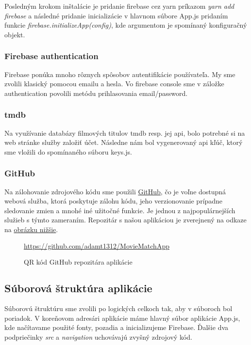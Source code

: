Posledným krokom inštalácie je pridanie firebase cez yarn príkazom \textit{yarn add firebase} a následné pridanie inicializácie v hlavnom súbore App.js pridaním funkcie \textit{firebase.initializeApp(config)}, kde argumentom je spomínaný konfiguračný objekt.
\subsubsection{Firebase authentication}
Firebase ponúka mnoho rôznych spôsobov autentifikácie používateľa. My sme zvolili klasický pomocou emailu a hesla. Vo firebase console sme v záložke authentication povolili metódu prihlasovania email/password. 
\subsubsection{\acrshort{tmdb}}
Na využívanie databázy filmových titulov \acrshort{tmdb} resp. jej \acrshort{api}, bolo potrebné si na web stránke služby založiť účet. Následne nám bol vygenerovaný \acrshort{api} kľúč, ktorý sme vložili do spomínaného súboru keys.js. 
\subsubsection{GitHub}
Na zálohovanie zdrojového kódu sme použili \href{https://github.com/}{GitHub}, čo je voľne dostupná webová služba, ktorá poskytuje zálohu kódu, jeho verzionovanie prípadne sledovanie zmien a mnohé iné užitočné funkcie. Je jednou z najpopulárnejších služieb s týmto zameraním. Repozitár s našou aplikáciou je zverejnený na odkaze na \hyperref[ghqrcode]{obrázku nižšie}. 

\begin{figure}[hbt!]
  \centering   
  \def\stackalignment{c}
           {\scriptsize%
            \url{https://github.com/adamt1312/MovieMatchApp}}
	\caption{QR kód GitHub repozitára aplikácie}  
  \label{ghqrcode}
\end{figure}
\subsection{Súborová štruktúra aplikácie}
Súborovú štruktúru sme zvolili po logických celkoch tak, aby v súboroch bol poriadok. V koreňovom adresári aplikácie máme hlavný súbor aplikácie App.js, kde načítavame použité fonty, pozadia a inicializujeme Firebase. Ďalšie dva podpriečinky \textit{src} a \textit{navigation} uchovávajú zvyšný zdrojový kód. 

